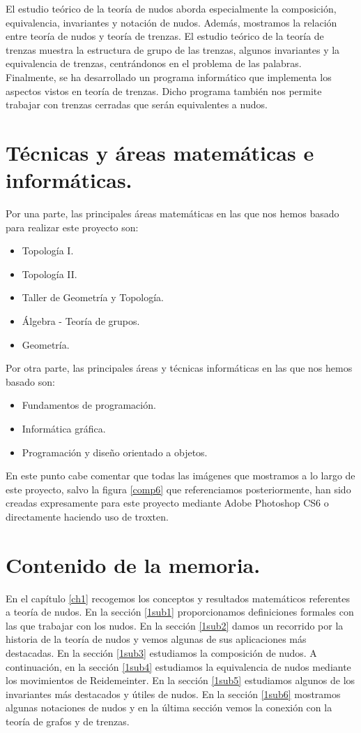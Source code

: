El estudio teórico de la teoría de nudos aborda especialmente la composición, equivalencia, invariantes y notación de nudos. Además, mostramos la relación entre teoría de nudos y teoría de trenzas. El estudio teórico de la teoría de trenzas muestra la estructura de grupo de las trenzas, algunos invariantes y la equivalencia de trenzas, centrándonos en el problema de las palabras. \\

Finalmente, se ha desarrollado un programa informático que implementa los aspectos vistos en teoría de trenzas. Dicho programa también nos permite trabajar con trenzas cerradas que serán equivalentes a nudos. \\

\section{Técnicas y áreas matemáticas e informáticas.}
Por una parte, las principales áreas matemáticas en las que nos hemos basado para realizar este proyecto son:
\begin{itemize}
	\item Topología I.
	\item Topología II.
	\item Taller de Geometría y Topología.
	\item Álgebra - Teoría de grupos. 
	\item Geometría.
\end{itemize}
Por otra parte, las principales áreas y técnicas informáticas en las que nos hemos basado son:
\begin{itemize}
	\item Fundamentos de programación.
	\item Informática gráfica.
	\item Programación y diseño orientado a objetos. 
\end{itemize}

En este punto cabe comentar que todas las imágenes que mostramos a lo largo de este proyecto, salvo la figura \ref{comp6} que referenciamos posteriormente, han sido creadas expresamente para este proyecto mediante Adobe Photoshop CS6 o directamente haciendo uso de troxten. 

\section{Contenido de la memoria.}
En el capítulo \ref{ch1} recogemos los conceptos y resultados matemáticos referentes a teoría de nudos. En la sección \ref{1sub1} proporcionamos definiciones formales con las que trabajar con los nudos. En la sección \ref{1sub2} damos un recorrido por la historia de la teoría de nudos y vemos algunas de sus aplicaciones más destacadas. En la sección \ref{1sub3} estudiamos la composición de nudos. A continuación, en la sección \ref{1sub4} estudiamos la equivalencia de nudos mediante los movimientos de Reidemeinter. En la sección \ref{1sub5} estudiamos algunos de los invariantes más destacados y útiles de nudos. En la sección \ref{1sub6} mostramos algunas notaciones de nudos y en la última sección vemos la conexión con la teoría de grafos y de trenzas.\\

